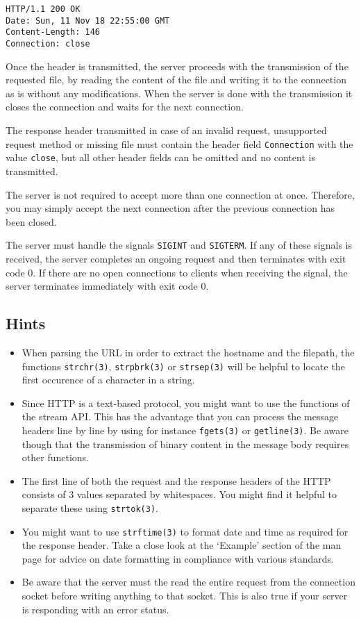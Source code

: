 \begin{verbatim}
HTTP/1.1 200 OK
Date: Sun, 11 Nov 18 22:55:00 GMT
Content-Length: 146
Connection: close
\end{verbatim}

Once the header is transmitted,
the server proceeds with the transmission of the requested file,
by reading the content of the file and writing it to the connection as is
without any modifications.
When the server is done with the transmission it closes the connection
and waits for the next connection.

The response header transmitted in case of an invalid request,
unsupported request method or missing file must contain
the header field \verb|Connection| with the value \verb|close|,
but all other header fields can be omitted and no content is transmitted.

The server is not required to accept more than one connection at once.
Therefore, you may simply accept the next connection
after the previous connection has been closed.

The server must handle the signals \verb|SIGINT| and \verb|SIGTERM|.
If any of these signals is received,
the server completes an ongoing request
and then terminates with exit code 0.
If there are no open connections to clients when receiving the signal,
the server terminates immediately with exit code 0.

\subsection*{Hints}
\begin{itemize}
\item When parsing the URL
in order to extract the hostname and the filepath,
the functions \verb|strchr(3)|, \verb|strpbrk(3)| or \verb|strsep(3)|
will be helpful to locate the first occurence of a character in a string.

\item Since HTTP is a text-based protocol,
you might want to use the functions of the stream API.
This has the advantage that you can process the message headers line by line
by using for instance \verb|fgets(3)| or \verb|getline(3)|.
Be aware though that the transmission of binary content
in the message body requires other functions.

\item The first line of both the request and the response headers of the HTTP
consists of 3 values separated by whitespaces.
You might find it helpful to separate these using \verb|strtok(3)|.

\item You might want to use \verb|strftime(3)|
to format date and time as required for the response header.
Take a close look at the `Example' section of the man page
for advice on date formatting in compliance with various standards.

\item Be aware that the server must the read the entire request
from the connection socket before writing anything to that socket.
This is also true if your server is responding with an error status.
\end{itemize}

